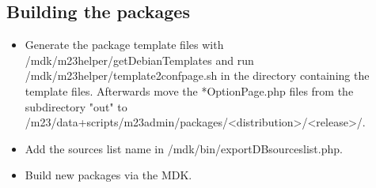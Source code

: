 \subsection{Building the packages}
\begin{itemize}
\item Generate the package template files with /mdk/m23helper/getDebianTemplates and run /mdk/m23helper/template2confpage.sh in the directory containing the template files. Afterwards move the *OptionPage.php files from the subdirectory "out" to /m23/data+scripts/m23admin/packages/<distribution>/<release>/.

\item Add the sources list name in /mdk/bin/exportDBsourceslist.php.

\item Build new packages via the MDK.
\end{itemize}